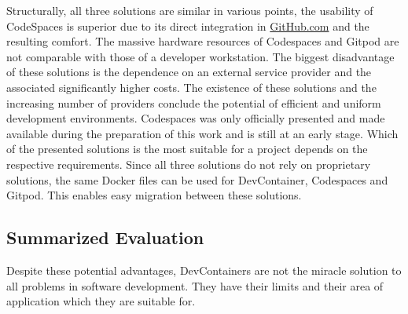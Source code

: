         Structurally, all three solutions are similar in various points, the usability of CodeSpaces is superior due to its direct integration in \href{https://www.GitHub.com}{GitHub.com} and the resulting comfort. The massive hardware resources of Codespaces and Gitpod are not comparable with those of a developer workstation. The biggest disadvantage of these solutions is the dependence on an external service provider and the associated significantly higher costs. The existence of these solutions and the increasing number of providers conclude the potential of efficient and uniform development environments. Codespaces was only officially presented and made available during the preparation of this work and is still at an early stage. Which of the presented solutions is the most suitable for a project depends on the respective requirements. Since all three solutions do not rely on proprietary solutions, the same Docker files can be used for DevContainer, Codespaces and Gitpod. This enables easy migration between these solutions.


    \subsection{Summarized Evaluation}
    Despite these potential advantages, DevContainers are not the miracle solution to all problems in software development. They have their limits and their area of application which they are suitable for.



